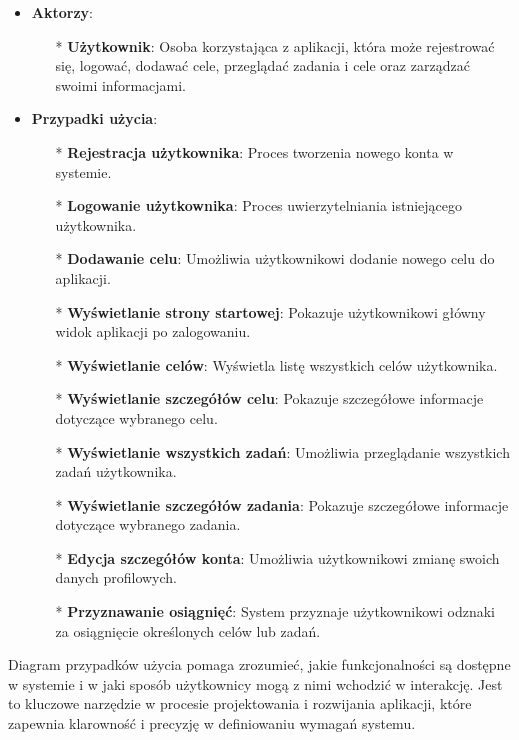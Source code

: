 \begin{itemize}
    \item \textbf{Aktorzy}:
    \begin{itemize}
        \item[*] \textbf{Użytkownik}: Osoba korzystająca z aplikacji, która może rejestrować się, logować, dodawać cele, przeglądać zadania i cele oraz zarządzać swoimi informacjami.
    \end{itemize}
    \clearpage

    \item \textbf{Przypadki użycia}:
    \begin{itemize}
        \item[*] \textbf{Rejestracja użytkownika}: Proces tworzenia nowego konta w systemie.
        \item[*] \textbf{Logowanie użytkownika}: Proces uwierzytelniania istniejącego użytkownika.
        \item[*] \textbf{Dodawanie celu}: Umożliwia użytkownikowi dodanie nowego celu do aplikacji.
        \item[*] \textbf{Wyświetlanie strony startowej}: Pokazuje użytkownikowi główny widok aplikacji po zalogowaniu.
        \item[*] \textbf{Wyświetlanie celów}: Wyświetla listę wszystkich celów użytkownika.
        \item[*] \textbf{Wyświetlanie szczegółów celu}: Pokazuje szczegółowe informacje dotyczące wybranego celu.
        \item[*] \textbf{Wyświetlanie wszystkich zadań}: Umożliwia przeglądanie wszystkich zadań użytkownika.
        \item[*] \textbf{Wyświetlanie szczegółów zadania}: Pokazuje szczegółowe informacje dotyczące wybranego zadania.
        \item[*] \textbf{Edycja szczegółów konta}: Umożliwia użytkownikowi zmianę swoich danych profilowych.
        \item[*] \textbf{Przyznawanie osiągnięć}: System przyznaje użytkownikowi odznaki za osiągnięcie określonych celów lub zadań.
    \end{itemize}
\end{itemize}

Diagram przypadków użycia pomaga zrozumieć, jakie funkcjonalności są dostępne w systemie i w jaki sposób użytkownicy mogą z nimi wchodzić w interakcję. Jest to kluczowe narzędzie w procesie projektowania i rozwijania aplikacji, które zapewnia klarowność i precyzję w definiowaniu wymagań systemu.

